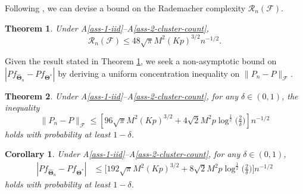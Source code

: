 \documentclass{article}
\newtheorem{thm}{Theorem}[section]
\newtheorem{lemma}{Lemma}[section]
\newtheorem{cor}{Corollary}[section]
\begin{document}
Following \citet{paul2021uniform}, we can devise a bound on the Rademacher complexity $\mathcal{R}_n(\mathcal{F})$.

\begin{thm}\label{thm-1-RnF}
    Under A\ref{ass-1-iid}--A\ref{ass-2-cluster-count}, 
    \begin{equation*}
        \mathcal{R}_n(\mathcal{F})\le 48\sqrt{\pi}M^2(Kp)^{3/2}n^{-1/2}.
    \end{equation*}
\end{thm}

Given the result stated in Theorem \ref{thm-1-RnF}, we seek a non-asymptotic bound on $|P f_{\widehat{\bm{\Theta}}_n}-Pf_{\bm{\Theta}^*}|$ by deriving a uniform concentration inequality on $\|P_n-P\|_{\mathcal{F}}$.

\begin{thm}\label{thm-2-diff-Pn-P}
    Under A\ref{ass-1-iid}--A\ref{ass-2-cluster-count}, for any $\delta\in(0,1)$, the inequality 
    \[\|P_n-P\|_\mathcal{F}\le \left[96\sqrt{\pi}M^2(Kp)^{3/2} + 4\sqrt{2} M^2p\log^{\frac{1}{2}}\big(\tfrac{2}{\delta}\big) \right] n^{-1/2}\]
    holds with probability at least $1-\delta$.
\end{thm}


\begin{cor}
    Under A\ref{ass-1-iid}--A\ref{ass-2-cluster-count}, for any $\delta\in(0,1)$,%
    \begin{align*}
    |P f_{\widehat{\bm{\Theta}}_n}-Pf_{\bm{\Theta}^*}| &\le \Big[192\sqrt{\pi}M^2(Kp)^{3/2}+ 8\sqrt{2} M^2p\log^{\frac{1}{2}}\big(\tfrac{2}{\delta}\big) \Big] n^{-1/2}
    \end{align*}
    holds with probability at least $1-\delta$.
\end{cor}
\end{document}
